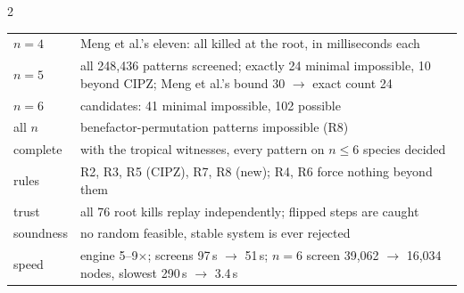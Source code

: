 \documentclass[10pt]{article}
\newcommand{\sect}[1]{\par\vspace{3pt}{\large\bfseries\color{black!80}#1}\par\vspace{1pt}}
\begin{document}
\begin{multicols}{2}
\sect{5. Achievements}
{\small
\begin{tabular}{@{}>{\raggedright\arraybackslash}p{}@{\hspace{0.5em}}>{\raggedright\arraybackslash}p{}@{}}
\toprule
$n=4$ & Meng et al.'s eleven: all killed at the root, in milliseconds each \\
$n=5$ & all 248{,}436 patterns screened; exactly 24 minimal impossible, 10 beyond CIPZ; Meng et al.'s bound 30 $\to$ exact count 24 \\
$n=6$ & 143 candidates: 41 minimal impossible, 102 possible \\
all $n$ & benefactor-permutation patterns impossible (R8) \\
complete & with the tropical witnesses, every pattern on $n\le6$ species decided \\
rules & R2, R3, R5 (CIPZ), R7, R8 (new); R4, R6 force nothing beyond them \\
trust & all 76 root kills replay independently; flipped steps are caught \\
soundness & no random feasible, stable system is ever rejected \\
speed & engine 5--9$\times$; screens 97\,s $\to$ 51\,s; $n=6$ screen 39{,}062 $\to$ 16{,}034 nodes, slowest 290\,s $\to$ 3.4\,s \\
\bottomrule
\end{tabular}}
\end{multicols}
\end{document}
